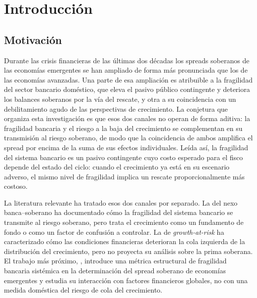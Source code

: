 
\section{Introducción}
\label{sec:intro}

\subsection{Motivación}

Durante las crisis financieras de las últimas dos décadas los spreads soberanos de las economías emergentes se han ampliado de forma más pronunciada que los de las economías avanzadas. Una parte de esa ampliación es atribuible a la fragilidad del sector bancario doméstico, que eleva el pasivo público contingente y deteriora los balances soberanos por la vía del rescate, y otra a su coincidencia con un debilitamiento agudo de las perspectivas de crecimiento. La conjetura que organiza esta investigación es que esos dos canales no operan de forma aditiva: la fragilidad bancaria y el riesgo a la baja del crecimiento se complementan en su transmisión al riesgo soberano, de modo que la coincidencia de ambos amplifica el spread por encima de la suma de sus efectos individuales. Leída así, la fragilidad del sistema bancario es un pasivo contingente cuyo costo esperado para el fisco depende del estado del ciclo: cuando el crecimiento ya está en su escenario adverso, el mismo nivel de fragilidad implica un rescate proporcionalmente más costoso.

La literatura relevante ha tratado esos dos canales por separado. La del nexo banca--soberano ha documentado cómo la fragilidad del sistema bancario se transmite al riesgo soberano, pero trata el crecimiento como un fundamento de fondo o como un factor de confusión a controlar. La de \textit{growth-at-risk} ha caracterizado cómo las condiciones financieras deterioran la cola izquierda de la distribución del crecimiento, pero no proyecta su análisis sobre la prima soberana. El trabajo más próximo, \citet{Chari2024b}, introduce una métrica estructural de fragilidad bancaria sistémica en la determinación del spread soberano de economías emergentes y estudia su interacción con factores financieros globales, no con una medida doméstica del riesgo de cola del crecimiento.
